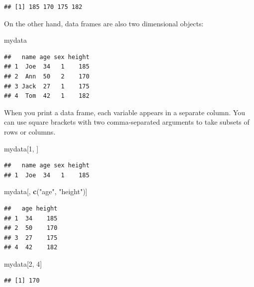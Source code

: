 \documentclass[
]{book}
\newenvironment{Shaded}{\begin{snugshade}}{\end{snugshade}}
\newcommand{\DecValTok}[1]{\textcolor[rgb]{0.00,0.00,0.81}{#1}}
\newcommand{\FunctionTok}[1]{\textcolor[rgb]{0.13,0.29,0.53}{\textbf{#1}}}
\newcommand{\NormalTok}[1]{#1}
\newcommand{\StringTok}[1]{\textcolor[rgb]{0.31,0.60,0.02}{#1}}
\theoremstyle{definition}
\theoremstyle{definition}
\theoremstyle{definition}
\theoremstyle{definition}
\theoremstyle{remark}
\begin{document}
\begin{verbatim}
## [1] 185 170 175 182
\end{verbatim}

On the other hand, data frames are also two dimensional objects:

\begin{Shaded}
\begin{Highlighting}[]
\NormalTok{mydata}
\end{Highlighting}
\end{Shaded}

\begin{verbatim}
##   name age sex height
## 1  Joe  34   1    185
## 2  Ann  50   2    170
## 3 Jack  27   1    175
## 4  Tom  42   1    182
\end{verbatim}

When you print a data frame, each variable appears in a separate
column. You can use square brackets with two comma-separated
arguments to take subsets of rows or columns.

\begin{Shaded}
\begin{Highlighting}[]
\NormalTok{mydata[}\DecValTok{1}\NormalTok{, ]}
\end{Highlighting}
\end{Shaded}

\begin{verbatim}
##   name age sex height
## 1  Joe  34   1    185
\end{verbatim}

\begin{Shaded}
\begin{Highlighting}[]
\NormalTok{mydata[, }\FunctionTok{c}\NormalTok{(}\StringTok{"age"}\NormalTok{, }\StringTok{"height"}\NormalTok{)]}
\end{Highlighting}
\end{Shaded}

\begin{verbatim}
##   age height
## 1  34    185
## 2  50    170
## 3  27    175
## 4  42    182
\end{verbatim}

\begin{Shaded}
\begin{Highlighting}[]
\NormalTok{mydata[}\DecValTok{2}\NormalTok{, }\DecValTok{4}\NormalTok{]}
\end{Highlighting}
\end{Shaded}

\begin{verbatim}
## [1] 170
\end{verbatim}
\end{document}
